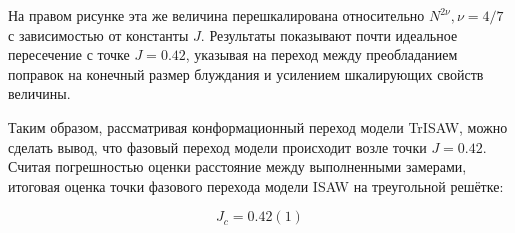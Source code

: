 На правом рисунке эта же величина перешкалирована относительно $N^{2\nu}, \nu = 4/7$ с зависимостью от константы $J$.
Результаты показывают почти идеальное пересечение с точке $J=0.42$, указывая на переход между преобладанием поправок на конечный размер блуждания и усилением шкалирующих свойств величины.

Таким образом, рассматривая конформационный переход модели TrISAW, можно сделать вывод, что фазовый переход модели происходит возле точки $J=0.42$.
Считая погрешностью оценки расстояние между выполненными замерами, итоговая оценка точки фазового перехода модели ISAW на треугольной решётке:

  \begin{equation}
\label{eq:TrISAW_Jc}
	J_c = 0.42(1)
\end{equation}